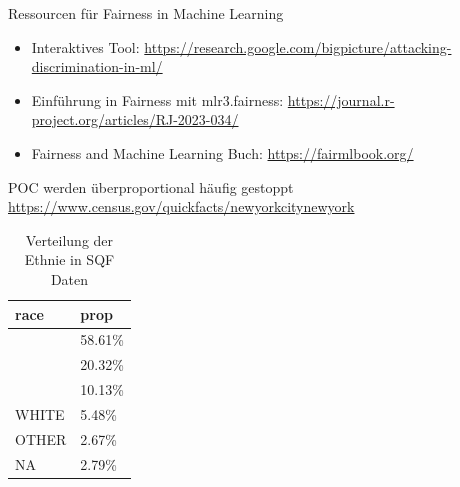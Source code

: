 \documentclass[aspectratio=169]{beamer}
\begin{document}
\begin{frame}{Ressourcen für Fairness in Machine Learning}
    \begin{itemize}
        \item Interaktives Tool: \url{https://research.google.com/bigpicture/attacking-discrimination-in-ml/}
        \item Einführung in Fairness mit mlr3.fairness: \url{https://journal.r-project.org/articles/RJ-2023-034/}
        \item Fairness and Machine Learning Buch: \url{https://fairmlbook.org/}
    \end{itemize}
\end{frame}


\begin{frame}{POC werden überproportional häufig gestoppt}
     \\
    \url{https://www.census.gov/quickfacts/newyorkcitynewyork}

    \vspace{0.3cm}  %

    \begin{table}
        \centering  %
		\caption{Verteilung der Ethnie in SQF Daten}
        \begin{tabular}{ll}
            \toprule
            race & prop \\
            \midrule
            \color{orange}{BLACK} & 58.61\% \\
            \color{orange}{WHITE HISPANIC} & 20.32\% \\
            \color{orange}{BLACK HISPANIC} & 10.13\% \\
            WHITE & 5.48\% \\
            OTHER & 2.67\% \\
            NA & 2.79\% \\
            \bottomrule
        \end{tabular}
    \end{table}
\end{frame}
\end{document}
